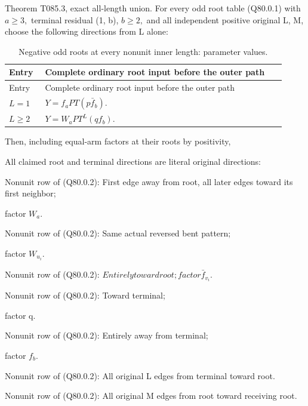 Theorem T085.3, exact all-length union. For every odd root table
(Q80.0.1) with \(a\ge 3,\allowbreak \) terminal residual (1, b), \(b\ge 2,\allowbreak \) and all independent
positive original L, M, choose the following directions from L alone:


\begingroup\small
\setlength{\tabcolsep}{3pt}
\setlength{\LTleft}{0pt}\setlength{\LTright}{\fill}
\begin{longtable}{@{}p{0.1200\linewidth}p{0.8000\linewidth}@{}}
\caption{Negative odd roots at every nonunit inner length: parameter values.}\label{tab:parameters:q5-c080:1}\\
\toprule
Entry & Complete ordinary root input before the outer path \\
\midrule\endfirsthead
\toprule
Entry & Complete ordinary root input before the outer path \\
\midrule\endhead
\bottomrule\endfoot
\(L=1\) & \(Y=f_aP T(p\bar f_b)\). \\
\addlinespace[2pt]
\(L\ge 2\) & \(Y=W_aP T^L(qf_b)\). \\
\end{longtable}
\endgroup


Then, including equal-arm factors at their roots by positivity,


All claimed root and terminal directions are literal original directions:

\begin{description}[style=nextline,leftmargin=1.6em]
\item[{\(Root a-arm\)}] Nonunit row of (Q80.0.2): First edge away from root, all later edges toward its first neighbor;\par\noindent factor \(W_a\).
\item[{\(Root u_i-arm\)}] Nonunit row of (Q80.0.2): Same actual reversed bent pattern;\par\noindent factor \(W_{u_i}\).
\item[{\(Root v_i-arm\)}] Nonunit row of (Q80.0.2): \(Entirely toward root; factor \bar f_{v_i}\).
\item[{Terminal unit arm}] Nonunit row of (Q80.0.2): Toward terminal;\par\noindent factor q.
\item[{Terminal b-arm}] Nonunit row of (Q80.0.2): Entirely away from terminal;\par\noindent factor \(f_b\).
\item[{Inner connector}] Nonunit row of (Q80.0.2): All original L edges from terminal toward root.
\item[{Outer connector}] Nonunit row of (Q80.0.2): All original M edges from root toward receiving root.
\end{description}

